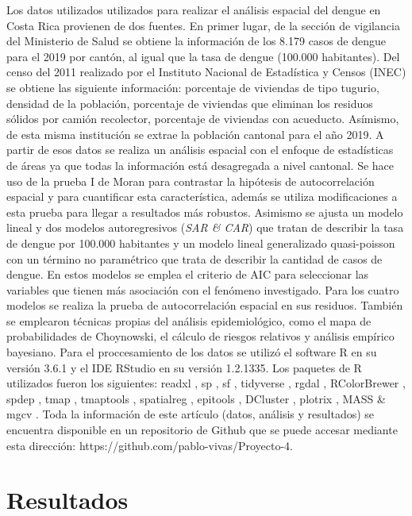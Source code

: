 \documentclass[12pt,a4paper]{article}
\begin{document}
Los datos utilizados utilizados para realizar el análisis espacial del dengue en Costa Rica provienen de dos fuentes. En primer lugar, de la sección de vigilancia del Ministerio de Salud se obtiene la información de los 8.179 casos de dengue para el 2019 por cantón, al igual que la tasa de dengue (100.000 habitantes). Del censo del 2011 realizado por el Instituto Nacional de Estadística y Censos (INEC) se obtiene las siguiente información: porcentaje de viviendas de tipo tugurio, densidad de la población, porcentaje de viviendas que eliminan los residuos sólidos por camión recolector, porcentaje de viviendas con acueducto. Asímismo, de esta misma institución se extrae la población cantonal para el año 2019.
\newpage
A partir de esos datos se realiza un análisis espacial con el enfoque de estadísticas de áreas ya que todas la información está desagregada a nivel cantonal. Se hace uso de la prueba I de Moran para contrastar la hipótesis de autocorrelación espacial y para cuantificar esta característica, además se utiliza modificaciones a esta prueba para llegar a resultados más robustos. Asimismo se ajusta un modelo lineal y dos modelos autoregresivos (\textit{SAR \& CAR}) que tratan de describir la tasa de dengue por 100.000 habitantes y un modelo lineal generalizado quasi-poisson con un término no paramétrico que trata de describir la cantidad de casos de dengue. En estos modelos se emplea el criterio de AIC para seleccionar las variables que tienen más asociación con el fenómeno investigado. Para los cuatro modelos se realiza la prueba de autocorrelación espacial en sus residuos. También se emplearon técnicas propias del análisis epidemiológico, como el mapa de probabilidades de Choynowski, el cálculo de riesgos relativos y análisis empírico bayesiano.
\newline
Para el proccesamiento de los datos se utilizó el software R \cite{R} en su versión 3.6.1 y el IDE RStudio en su versión 1.2.1335. Los paquetes de R utilizados fueron los siguientes: readxl \cite{readxl}, sp \cite{sp}, sf \cite{sf}, tidyverse \cite{tidy}, rgdal \cite{rdal}, RColorBrewer \cite{Rcolor}, spdep \cite{sp}, tmap \cite{tmap}, tmaptools \cite{tmaptools}, spatialreg \cite{sp}, epitools \cite{epitools}, DCluster \cite{dcluster}, plotrix \cite{plotrix}, MASS \cite{MASS} \& mgcv \cite{mgcv}. Toda la información de este artículo (datos, análisis y resultados) se encuentra disponible en un repositorio de Github que se puede accesar mediante esta dirección: https://github.com/pablo-vivas/Proyecto-4.
\section{Resultados}
\end{document}
